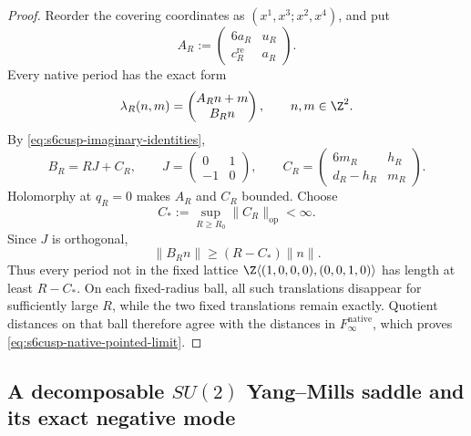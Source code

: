 \begin{proof}
Reorder the covering coordinates as
\((x^1,x^3;x^2,x^4)\), and put
\begin{equation}\label{eq:s6cusp-AR-matrix}
 A_R:=
 \begin{pmatrix}
 6a_R&u_R\\
 c_R^{\mathrm{re}}&a_R
 \end{pmatrix}.
\end{equation}
Every native period has the exact form
\begin{equation}\label{eq:s6cusp-native-period-block-form}
 \lambda_R(n,m)=
 \begin{pmatrix}A_Rn+m\\B_Rn\end{pmatrix},
 \qquad n,m\in\Z^2.
\end{equation}
By \eqref{eq:s6cusp-imaginary-identities},
\begin{equation}\label{eq:s6cusp-BR-cusp-splitting}
 B_R=RJ+C_R,\qquad
 J=\begin{pmatrix}0&1\\-1&0\end{pmatrix},\qquad
 C_R=
 \begin{pmatrix}
 6m_R&h_R\\
 d_R-h_R&m_R
 \end{pmatrix}.
\end{equation}
Holomorphy at \(q_R=0\) makes \(A_R\) and \(C_R\) bounded.  Choose
\begin{equation}\label{eq:s6cusp-Cstar}
 C_*:=\sup_{R\ge R_0}\lVert C_R\rVert_{\mathrm{op}}<\infty.
\end{equation}
Since \(J\) is orthogonal,
\begin{equation}\label{eq:s6cusp-BR-lower-bound}
 \lVert B_Rn\rVert
 \ge(R-C_*)\lVert n\rVert.
\end{equation}
Thus every period not in the fixed lattice
\(\Z\langle(1,0,0,0),(0,0,1,0)\rangle\) has length at least
\(R-C_*\).  On each fixed-radius ball, all such translations disappear
for sufficiently large \(R\), while the two fixed translations remain
exactly.  Quotient distances on that ball therefore agree with the
distances in \(F_\infty^{\mathrm{native}}\), which proves
\eqref{eq:s6cusp-native-pointed-limit}.
\end{proof}

\subsection{A decomposable \texorpdfstring{\(SU(2)\)}{SU(2)}
Yang--Mills saddle and its exact negative mode}
\label{subsec:s6cusp-reducible-su2-saddle}


